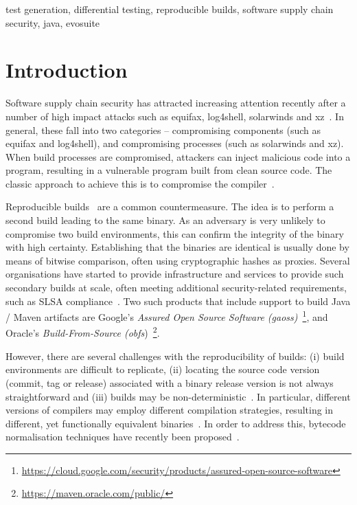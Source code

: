 \documentclass[conference]{IEEEtran}
\begin{document}
\begin{IEEEkeywords}
test generation, differential testing, reproducible builds, software supply chain security, java, evosuite
\end{IEEEkeywords}

\section{Introduction}

Software supply chain security has attracted increasing attention recently after a number of high impact attacks such as \textsf{equifax}, \textsf{log4shell}, \textsf{solarwinds} and \textsf{xz}~\cite{ellison2010evaluating,martinez2021software,enck2022top,EO14028}. In general, these fall into two categories -- compromising components (such as \textsf{equifax} and \textsf{log4shell}), and compromising processes (such as \textsf{solarwinds} and \textsf{xz}). When build processes are compromised, attackers can inject malicious code into a program, resulting in a vulnerable program built from clean source code. The classic approach to achieve this is to compromise the compiler~\cite{thompson1984reflections}. 

Reproducible builds~\cite{reproduciblebuild, lamb2021reproducible} are a common countermeasure. The idea is to perform a second build leading to the same binary. As an adversary is very unlikely to compromise two build environments, this can confirm the integrity of the binary with high certainty. Establishing that the binaries are identical is usually done by means of bitwise comparison, often using cryptographic hashes as proxies.
Several organisations have started to provide infrastructure and services to provide such secondary builds at scale, often meeting additional security-related requirements, such as SLSA compliance~\cite{slsa}. Two such products that include support to build Java / Maven artifacts are Google's \textit{Assured Open Source Software (gaoss)}~\footnote{\url{https://cloud.google.com/security/products/assured-open-source-software}}, and Oracle's \textit{Build-From-Source (obfs})~\footnote{\url{https://maven.oracle.com/public/}}.

However, there are several challenges with the reproducibility of builds: (i) build environments are difficult to replicate, (ii) locating the source code version (commit, tag or release) associated with a binary release version is not always straightforward and (iii) builds may be non-deterministic~\cite{xiong2022towards,hassanshahi2023macaron,bineqdataset,keshani2024aroma}. In particular, different versions of compilers may employ different compilation strategies, resulting in different, yet functionally equivalent binaries~\cite{xiong2022towards,bineqdataset,schott2024JNorm}.  
In order to address this, bytecode normalisation techniques have recently been proposed~\cite{xiong2022towards,dietrich2024levelsbinaryequivalencecomparison,schott2024JNorm}. 
\end{document}
